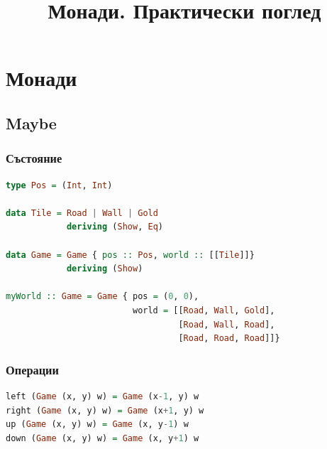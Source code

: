 \documentclass{beamer}
\begin{document}
\title[Монади]{Монади. Практически поглед}
\frame{\titlepage}

\section{Монади}
\subsection{Maybe}


\begin{frame}[fragile]
  \frametitle{Състояние}

\begin{lstlisting}[basicstyle=\small,language=Haskell]
type Pos = (Int, Int)
  
data Tile = Road | Wall | Gold
            deriving (Show, Eq)
  
data Game = Game { pos :: Pos, world :: [[Tile]]}
            deriving (Show)
  
myWorld :: Game = Game { pos = (0, 0), 
                         world = [[Road, Wall, Gold], 
                                  [Road, Wall, Road], 
                                  [Road, Road, Road]]}
\end{lstlisting}


\end{frame}


\begin{frame}[fragile]
  \frametitle{Операции}

\begin{lstlisting}[basicstyle=\small,language=Haskell]
left (Game (x, y) w) = Game (x-1, y) w
right (Game (x, y) w) = Game (x+1, y) w
up (Game (x, y) w) = Game (x, y-1) w
down (Game (x, y) w) = Game (x, y+1) w
\end{lstlisting}

\end{frame}
\end{document}
